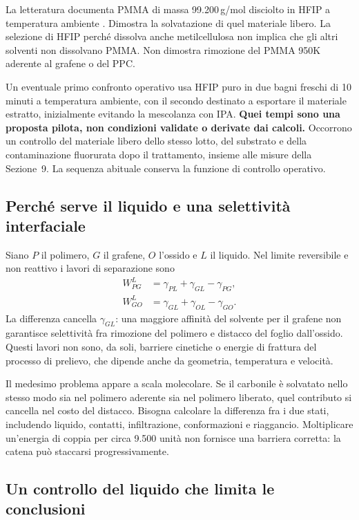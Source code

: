 \documentclass[11pt,reqno]{amsart}
\numberwithin{equation}{section}
\begin{document}
La letteratura documenta PMMA di massa 99.200\,g/mol disciolto in HFIP
a temperatura ambiente \cite{WangHFIP2020}. Dimostra la solvatazione
di quel materiale libero. La selezione di HFIP perch\'e dissolva anche
metilcellulosa non implica che gli altri solventi non dissolvano PMMA.
Non dimostra rimozione del PMMA 950K aderente al grafene o del PPC.

Un eventuale primo confronto operativo usa HFIP puro in due bagni
freschi di 10 minuti a temperatura ambiente, con il secondo destinato
a esportare il materiale estratto, inizialmente evitando la mescolanza
con IPA. \textbf{Quei tempi sono una proposta pilota, non condizioni
validate o derivate dai calcoli.} Occorrono un controllo del materiale
libero dello stesso lotto, del substrato e della contaminazione
fluorurata dopo il trattamento, insieme alle misure della Sezione~9.
La sequenza abituale conserva la funzione di controllo operativo.

\subsection{Perch\'e serve il liquido e una selettivit\`a interfaciale}

Siano $P$ il polimero, $G$ il grafene, $O$ l'ossido e $L$ il liquido.
Nel limite reversibile e non reattivo i lavori di separazione sono
\begin{align}
 W_{PG}^{L}&=\gamma_{PL}+\gamma_{GL}-\gamma_{PG},\\
 W_{GO}^{L}&=\gamma_{GL}+\gamma_{OL}-\gamma_{GO}.
\end{align}
La differenza cancella $\gamma_{GL}$: una maggiore affinit\`a del
solvente per il grafene non garantisce selettivit\`a fra rimozione
del polimero e distacco del foglio dall'ossido. Questi lavori non
sono, da soli, barriere cinetiche o energie di frattura del processo
di prelievo, che dipende anche da geometria, temperatura e velocit\`a.

Il medesimo problema appare a scala molecolare. Se il carbonile \`e
solvatato nello stesso modo sia nel polimero aderente sia nel polimero
liberato, quel contributo si cancella nel costo del distacco.
Bisogna calcolare la differenza fra i due stati, includendo liquido,
contatti, infiltrazione, conformazioni e riaggancio. Moltiplicare
un'energia di coppia per circa 9.500 unit\`a non fornisce una barriera
corretta: la catena pu\`o staccarsi progressivamente.

\subsection{Un controllo del liquido che limita le conclusioni}
\end{document}
